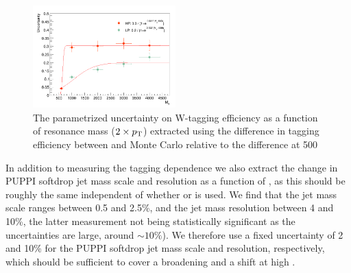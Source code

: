  \begin{figure}[h!]
 \centering
 \includegraphics[width=0.49\textwidth]{figures/vtagging/2017_sf/ptdep.png}
 \caption{The parametrized uncertainty on W-tagging efficiency as a function of resonance mass ($2\times p_{\mathrm{T}}$) extracted using the difference in tagging efficiency between \PYTHIA and \HERWIG{++} Monte Carlo relative to the difference at 500 \GeV}
 \label{fig:searchIII:tau21ptdep}
 \end{figure}
 
In addition to measuring the tagging \PT dependence we also extract the change in PUPPI softdrop jet mass scale and resolution as a function of \PT, as this should be roughly the same independent of whether \nsubj or \ddt is used. We find that the jet mass scale ranges between 0.5 and 2.5\%, and the jet mass resolution between 4 and 10\%, the latter measurement not being statistically significant as the uncertainties are large, around $\sim10\%$). We therefore use a fixed uncertainty of 2 and 10\% for the PUPPI softdrop jet mass scale and resolution, respectively, which should be sufficient to cover a broadening and a shift at high \PT.
   
\clearpage    
